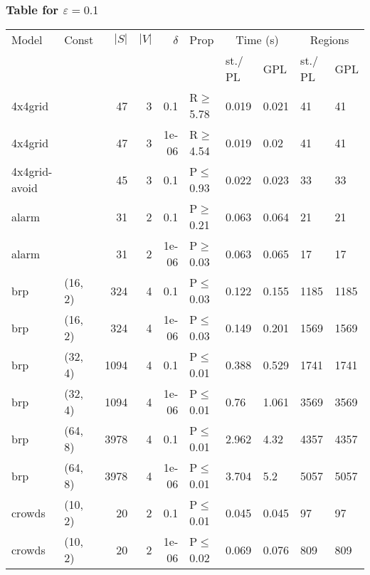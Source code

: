 \subsubsection{Table for \(\varepsilon=0.1\)}
\begin{longtable}{llrrrlllll}

        \toprule
        Model & Const & $|S|$ & $|V|$ & $\delta$ & Prop & \multicolumn{2}{c}{Time (s)} & \multicolumn{2}{c}{Regions} \\
        \cmidrule(ll){7-8} \cmidrule(ll){9-10}
        & & & & & & st./ PL & GPL & st./ PL & GPL \\
        \midrule
        
 4x4grid       &           &     	47 &   3 & 0.1   & R$\geq$5.78  & 0.019  & 0.021  & 41      & 41      \\
 4x4grid       &           &     	47 &   3 & 1e-06 & R$\geq$4.54  & 0.019  & 0.02   & 41      & 41      \\
 4x4grid-avoid &           &     	45 &   3 & 0.1   & P$\leq$0.93  & 0.022  & 0.023  & 33      & 33      \\
 alarm         &           &     	31 &   2 & 0.1   & P$\geq$0.21  & 0.063  & 0.064  & 21      & 21      \\
 alarm         &           &     	31 &   2 & 1e-06 & P$\geq$0.03  & 0.063  & 0.065  & 17      & 17      \\
 brp           & (16, 2)   &    	324 &   4 & 0.1   & P$\leq$0.03  & 0.122  & 0.155  & 1185    & 1185    \\
 brp           & (16, 2)   &    	324 &   4 & 1e-06 & P$\leq$0.03  & 0.149  & 0.201  & 1569    & 1569    \\
 brp           & (32, 4)   &   	1094 &   4 & 0.1   & P$\leq$0.01  & 0.388  & 0.529  & 1741    & 1741    \\
 brp           & (32, 4)   &   	1094 &   4 & 1e-06 & P$\leq$0.01  & 0.76   & 1.061  & 3569    & 3569    \\
 brp           & (64, 8)   &   	3978 &   4 & 0.1   & P$\leq$0.01  & 2.962  & 4.32   & 4357    & 4357    \\
 brp           & (64, 8)   &   	3978 &   4 & 1e-06 & P$\leq$0.01  & 3.704  & 5.2    & 5057    & 5057    \\
 crowds        & (10, 2)   &     	20 &   2 & 0.1   & P$\leq$0.01  & 0.045  & 0.045  & 97      & 97      \\
 crowds        & (10, 2)   &     	20 &   2 & 1e-06 & P$\leq$0.02  & 0.069  & 0.076  & 809     & 809     \\

\end{longtable}
